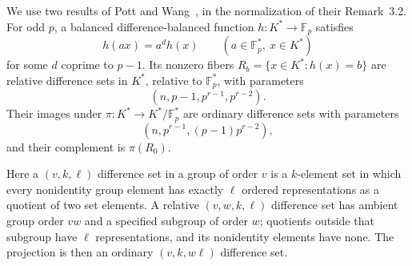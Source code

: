 \documentclass[11pt]{article}
\theoremstyle{definition}
\theoremstyle{remark}
\newcommand{\Fp}{\mathbb F_p}
\numberwithin{equation}{section}
\begin{document}
We use two results of Pott and Wang~\cite[Theorem~5.4 and
Corollary~5.5]{PottWang}, in the normalization of their Remark~3.2.
For odd \(p\), a balanced difference-balanced function
\(h:K^*\to\Fp\) satisfies
\begin{equation}\label{eq:scalarhom}
 h(ax)=a^d h(x)\qquad(a\in\Fp^*,\ x\in K^*)
\end{equation}
for some \(d\) coprime to \(p-1\).
Its nonzero fibers
\(R_b=\{x\in K^*:h(x)=b\}\) are relative difference sets in \(K^*\),
relative to \(\Fp^*\), with parameters
\begin{equation}\label{eq:rdsparams}
 (n,p-1,p^{r-1},p^{r-2}).
\end{equation}
Their images under \(\pi:K^*\to K^*/\Fp^*\) are ordinary difference
sets with parameters
\[
 (n,p^{r-1},(p-1)p^{r-2}),
\]
and their complement is \(\pi(R_0)\).

Here a \((v,k,\ell)\) difference set in a group of order \(v\) is a
\(k\)-element set in which every nonidentity group element has exactly
\(\ell\) ordered representations as a quotient of two set elements.
A relative \((v,w,k,\ell)\) difference set has ambient group order \(vw\)
and a specified subgroup of order \(w\); quotients outside that subgroup
have \(\ell\) representations, and its nonidentity elements have none.
The projection is then an ordinary \((v,k,w\ell)\) difference set.
\end{document}
